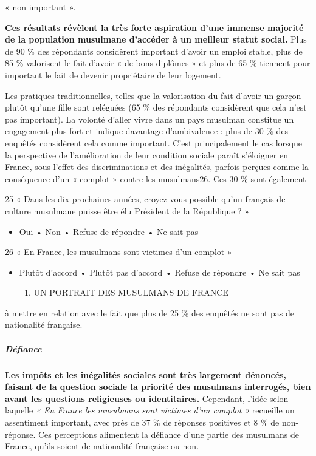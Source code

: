 « non important ».

\textbf{Ces résultats révèlent la très forte aspiration d'une immense
majorité de la population musulmane d'accéder à un meilleur statut
social.} Plus de 90 \% des répondants considèrent important d'avoir un
emploi stable, plus de 85 \% valorisent le fait d'avoir « de bons
diplômes » et plus de 65 \% tiennent pour important le fait de devenir
propriétaire de leur logement.

Les pratiques traditionnelles, telles que la valorisation du fait
d'avoir un garçon plutôt qu'une fille sont reléguées (65 \% des
répondants considèrent que cela n'est pas important). La volonté d'aller
vivre dans un pays musulman constitue un engagement plus fort et indique
davantage d'ambivalence : plus de 30 \% des enquêtés considèrent cela
comme important. C'est principalement le cas lorsque la perspective de
l'amélioration de leur condition sociale paraît s'éloigner en France,
sous l'effet des discriminations et des inégalités, parfois perçues
comme la conséquence d'un « complot » contre les musulmans26. Ces 30 \%
sont également

25 « Dans les dix prochaines années, croyez-vous possible qu'un français
de culture musulmane puisse être élu Président de la République ? »


\begin{itemize}
\item
  Oui • Non • Refuse de répondre • Ne sait pas
\end{itemize}


26 « En France, les musulmans sont victimes d'un complot »


\begin{itemize}
\item
  Plutôt d'accord • Plutôt pas d'accord • Refuse de répondre • Ne sait
  pas

  \begin{enumerate}
  \def\labelenumi{\Roman{enumi}.}
  \item
    UN PORTRAIT DES MUSULMANS DE FRANCE
  \end{enumerate}
\end{itemize}


à mettre en relation avec le fait que plus de 25 \% des enquêtés ne sont
pas de nationalité française.


\hypertarget{duxe9fiance}{%
\subparagraph{Défiance}\label{duxe9fiance}}


\textbf{Les impôts et les inégalités sociales sont très largement
dénoncés, faisant de la question sociale la priorité des musulmans
interrogés, bien avant les questions religieuses ou identitaires.}
Cependant, l'idée selon laquelle \emph{« En France les musulmans sont
victimes d'un complot »} recueille un assentiment important, avec près
de 37 \% de réponses positives et 8 \% de non-réponse. Ces perceptions
alimentent la défiance d'une partie des musulmans de France, qu'ils
soient de nationalité française ou non.

